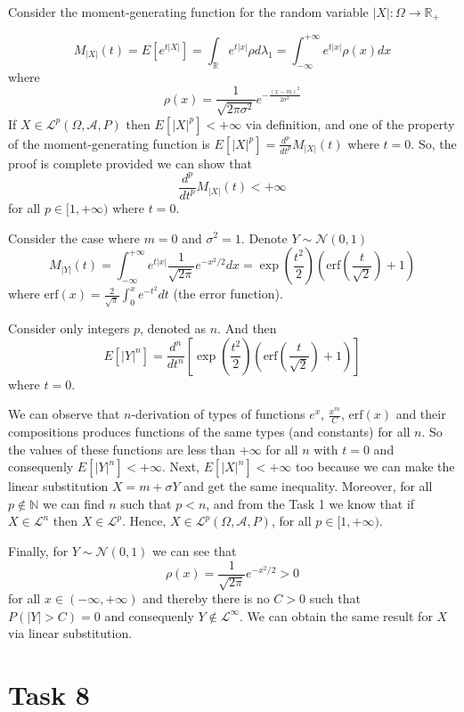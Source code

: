 \documentclass{article}
\begin{document}
Consider the moment-generating function for the random variable $|X| : \Omega \rightarrow \mathbb R_+$

$$M_{|X|}(t) = E[e^{t|X|}] = \int_{\mathbb R}e^{t|x|} \rho d \lambda_1 = \int_{-\infty}^{+\infty} e^{t|x|} \rho(x) dx$$
where
$$\rho(x) = \frac{1}{\sqrt{2 \pi \sigma^2}} e^{-\frac{(x-m)^2}{2 \sigma^2}}$$
If $X \in \mathcal L^p(\Omega, \mathcal A, P)$ then $E[|X|^p]<+\infty$ via definition, and one of the property of the moment-generating function is $E[|X|^p] = \frac{d^p}{dt^p}M_{|X|}(t)$ where $t = 0$. So, the proof is complete provided we can show that $$\frac{d^p}{dt^p}M_{|X|}(t) <+\infty$$ for all $p \in [1, +\infty)$ where $t = 0$.

Consider the case where $m = 0$ and $\sigma^2 = 1$. Denote $Y \sim \mathcal N(0, 1)$
$$M_{|Y|}(t) = \int_{-\infty}^{+\infty}e^{t|x|}  \frac{1}{\sqrt{2 \pi}} e^{-x^2/2} dx = 
\exp\left(\frac{t^2}{2}\right)\left(\text{erf}\left(\frac{t}{\sqrt 2}\right) + 1\right)$$
where $\text{erf}(x) = \frac{2}{\sqrt \pi}\int_0^x e^{-t^2}dt$ (the error function).

Consider only integers $p$, denoted as $n$. And then
$$E[|Y|^n] = 
\frac{d^n}{dt^n}\left[\exp\left(\frac{t^2}{2}\right)\left(\text{erf}\left(\frac{t}{\sqrt 2}\right) + 1\right)\right]$$ where $t=0$.

We can observe that $n$-derivation of types of functions $e^x$, $\frac{x^m}{C}$, $\text{erf}(x)$ and their compositions produces functions of the same types (and constants) for all $n$. So the values of these functions are less than $+\infty$ for all $n$ with $t = 0$ and consequenly $E[|Y|^n] < +\infty$. Next, $E[|X|^n] < +\infty$ too because we can make the linear substitution $X = m + \sigma Y$ and get the same inequality. Moreover, for all $p \notin \mathbb N$ we can find $n$ such that $p < n$, and from the Task 1 we know that if $X \in \mathcal L^n$ then $X \in \mathcal L^p$. Hence, $X \in \mathcal L^p (\Omega, \mathcal A, P)$, for all $p \in [1, +\infty)$.

Finally, for $ Y \sim\mathcal N(0,1)$ we can see that
$$\rho(x) = \frac{1}{\sqrt{2 \pi}}e^{-x^2/2} > 0$$ for all $x\in(-\infty, +\infty)$ and thereby there is no $C > 0$ such that $P(|Y| > C) = 0$ and consequenly $Y \notin \mathcal L^\infty$. We can obtain the same result for $X$ via linear substitution.

\section*{Task 8}
\end{document}
